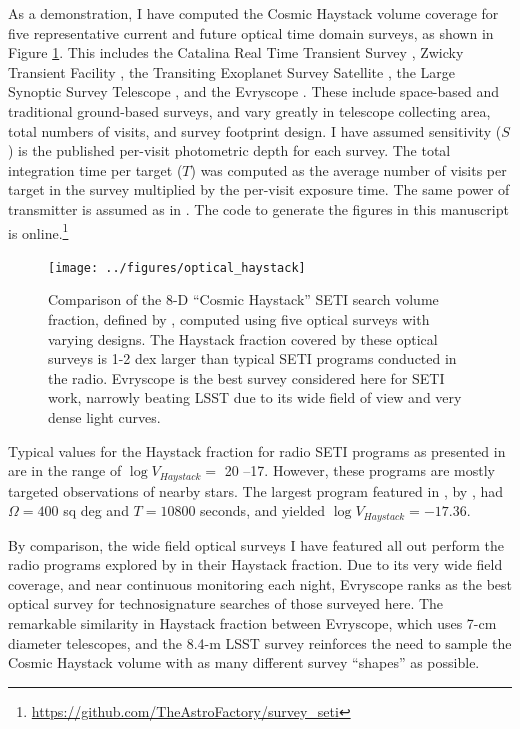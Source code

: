 \documentclass[twocolumn]{aastex62}
\begin{document}
As a demonstration, I have computed the Cosmic Haystack volume coverage for five representative current and future optical time domain surveys, as shown in Figure \ref{fig:hay}. This includes the Catalina Real Time Transient Survey \citep[CRTS;][]{catalina}, Zwicky Transient Facility \citep[ZTF;][]{bellm2014}, the Transiting Exoplanet Survey Satellite \citep[TESS;][]{tess}, the Large Synoptic Survey Telescope \citep[LSST;][]{lsst}, and the Evryscope \citep{law2015}. These include space-based and traditional ground-based surveys, and vary greatly in telescope collecting area, total numbers of visits, and survey footprint design. %
I have assumed sensitivity ($S$) is the published per-visit photometric depth for each survey. The total integration time per target ($T$) was computed as the average number of visits per target in the survey multiplied by the per-visit exposure time. The same power of transmitter is assumed as in \citet{wright2018c}. 
The code to generate the figures in this manuscript is online.\footnote{\url{https://github.com/TheAstroFactory/survey_seti}}


\begin{figure}[]
\centering
\texttt{[image: ../figures/optical\_haystack]}
\caption{
Comparison of the 8-D ``Cosmic Haystack'' SETI search volume fraction, defined by \citet{wright2018c}, computed using five optical surveys with varying designs. The Haystack fraction covered by these optical surveys is 1-2 dex larger than typical SETI programs conducted in the radio.
Evryscope \citet{law2015} is the best survey considered here for SETI work, narrowly beating LSST due to its wide field of view and very dense light curves.}
\label{fig:hay}
\end{figure}


Typical values for the Haystack fraction for radio SETI programs as presented in \citet{wright2018c}  are in the range of $\log V_{Haystack} = $ 20 --17. However, these programs are mostly targeted observations of nearby stars. The largest program featured in \citet{wright2018c}, by \citet{tingay2018}, had $\Omega=400$ sq deg and $T=10800$ seconds, and yielded $\log V_{Haystack} =  -17.36$.

By comparison, the wide field optical surveys I have featured all out perform the radio programs explored by \citet{wright2018c} in their Haystack fraction.
Due to its very wide field coverage, and near continuous monitoring each night, Evryscope ranks as the best optical survey for technosignature searches of those surveyed here. The remarkable similarity in Haystack fraction between Evryscope, which uses 7-cm diameter telescopes, and the 8.4-m LSST survey reinforces the need to sample the Cosmic Haystack volume with as many different survey ``shapes'' as possible.
\end{document}
